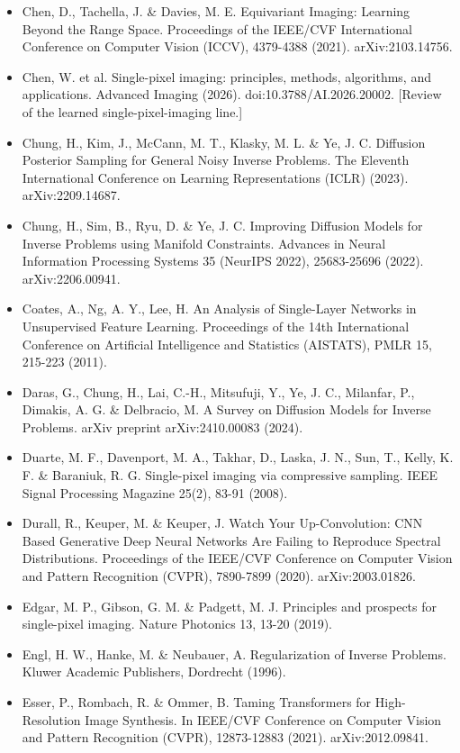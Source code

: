\documentclass[11pt]{article}
\begin{document}
\begin{itemize}
\item Chen, D., Tachella, J. \& Davies, M. E. Equivariant Imaging: Learning Beyond the Range Space. Proceedings of the IEEE/CVF International Conference on Computer Vision (ICCV), 4379-4388 (2021). arXiv:2103.14756.
\item Chen, W. et al. Single-pixel imaging: principles, methods, algorithms, and applications. Advanced Imaging (2026). doi:10.3788/AI.2026.20002. [Review of the learned single-pixel-imaging line.]
\item Chung, H., Kim, J., McCann, M. T., Klasky, M. L. \& Ye, J. C. Diffusion Posterior Sampling for General Noisy Inverse Problems. The Eleventh International Conference on Learning Representations (ICLR) (2023). arXiv:2209.14687.
\item Chung, H., Sim, B., Ryu, D. \& Ye, J. C. Improving Diffusion Models for Inverse Problems using Manifold Constraints. Advances in Neural Information Processing Systems 35 (NeurIPS 2022), 25683-25696 (2022). arXiv:2206.00941.
\item Coates, A., Ng, A. Y., Lee, H. An Analysis of Single-Layer Networks in Unsupervised Feature Learning. Proceedings of the 14th International Conference on Artificial Intelligence and Statistics (AISTATS), PMLR 15, 215-223 (2011).
\item Daras, G., Chung, H., Lai, C.-H., Mitsufuji, Y., Ye, J. C., Milanfar, P., Dimakis, A. G. \& Delbracio, M. A Survey on Diffusion Models for Inverse Problems. arXiv preprint arXiv:2410.00083 (2024).
\item Duarte, M. F., Davenport, M. A., Takhar, D., Laska, J. N., Sun, T., Kelly, K. F. \& Baraniuk, R. G. Single-pixel imaging via compressive sampling. IEEE Signal Processing Magazine 25(2), 83-91 (2008).
\item Durall, R., Keuper, M. \& Keuper, J. Watch Your Up-Convolution: CNN Based Generative Deep Neural Networks Are Failing to Reproduce Spectral Distributions. Proceedings of the IEEE/CVF Conference on Computer Vision and Pattern Recognition (CVPR), 7890-7899 (2020). arXiv:2003.01826.
\item Edgar, M. P., Gibson, G. M. \& Padgett, M. J. Principles and prospects for single-pixel imaging. Nature Photonics 13, 13-20 (2019).
\item Engl, H. W., Hanke, M. \& Neubauer, A. Regularization of Inverse Problems. Kluwer Academic Publishers, Dordrecht (1996).
\item Esser, P., Rombach, R. \& Ommer, B. Taming Transformers for High-Resolution Image Synthesis. In IEEE/CVF Conference on Computer Vision and Pattern Recognition (CVPR), 12873-12883 (2021). arXiv:2012.09841.

\end{itemize}
\end{document}
